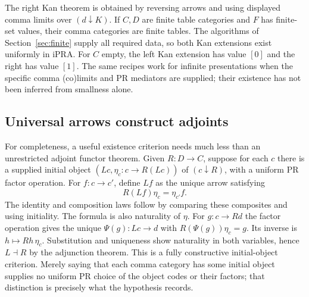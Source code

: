 The right Kan theorem is obtained by reversing arrows and using displayed
comma limits over $(d\downarrow K)$. If $C,D$ are finite table categories
and $F$ has finite-set values, their comma categories are finite tables.
The algorithms of Section~\ref{sec:finite} supply all required data,
so both Kan extensions exist uniformly in iPRA. For $C$ empty, the
left Kan extension has value $[0]$ and the right has value $[1]$.
The same recipes work for infinite presentations when the specific
comma (co)limits and PR mediators are supplied; their existence has not
been inferred from smallness alone.

\subsection{Universal arrows construct adjoints}
For completeness, a useful existence criterion needs much less than an
unrestricted adjoint functor theorem. Given $R:D\to C$, suppose for
each $c$ there is a supplied initial object $(Lc,\eta_c:c\to R(Lc))$
of $(c\downarrow R)$, with a uniform PR factor operation. For
$f:c\to c'$, define $Lf$ as the unique arrow satisfying
\[
                       R(Lf)\eta_c=\eta_{c'}f.
\]
The identity and composition laws follow by comparing these composites
and using initiality. The formula is also naturality of $\eta$.
For $g:c\to Rd$ the factor operation gives the unique
$\Psi(g):Lc\to d$ with $R(\Psi(g))\eta_c=g$. Its inverse is
$h\mapsto Rh\,\eta_c$. Substitution and uniqueness show naturality
in both variables, hence $L\dashv R$ by the adjunction theorem.
This is a fully constructive initial-object criterion. Merely saying
that each comma category has some initial object supplies no uniform
PR choice of the object codes or their factors; that distinction is
precisely what the hypothesis records.
